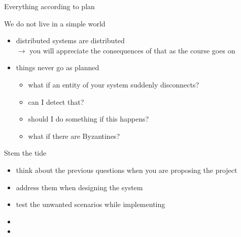 \documentclass[presentation]{beamer}\mode<presentation>{\usetheme{AMSBolognaFC}}
\begin{document}
\begin{frame}[c,allowframebreaks]{Everything according to plan}
    \begin{block}{We do not live in a simple world}
        \begin{itemize}
            \item distributed systems are \alert{distributed}
            \\
            $\rightarrow$ you will appreciate the consequences of that as the course goes on
            \item things \alert{never} go as planned
            \begin{itemize}
                \item what if an entity of your system suddenly disconnects?
                \item can I detect that?
                \item should I do something if this happens?
                \item what if there are Byzantines?
            \end{itemize}
        \end{itemize}
    \end{block}
     
    \framebreak
    
    \begin{block}{Stem the tide}
        \begin{itemize}
            \item think about the previous questions when you are proposing the project
            \item address them when designing the system
            \item test the unwanted scenarios while implementing
            \item {}
            \item {}
        \end{itemize}
    \end{block}
    
    \framebreak
    

\end{frame}
\end{document}
